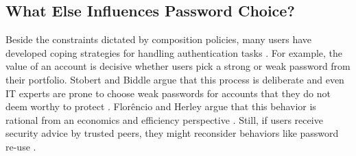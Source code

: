 \subsection{What Else Influences Password Choice?}
Beside the constraints dictated by composition policies, many users have developed coping strategies for handling authentication tasks \cite{Stobert2014PasswordLifeCycle}. For example, the value of an account is decisive whether users pick a strong or weak password from their portfolio. Stobert and Biddle argue that this process is deliberate and even IT experts are prone to choose weak passwords for accounts that they do not deem worthy to protect  \cite{Stobert2015ExpertPassword}. Flor\^{e}ncio and Herley argue that this behavior is rational from an economics and efficiency perspective \cite{Florencio2014PasswordPortfoliosFiniteUser}. Still, if users receive security advice by trusted peers, they might reconsider behaviors like password re-use \cite{Das2014EffectSocialInfluenceSecuritySensitivity}.

